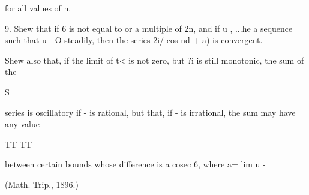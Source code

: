 for all values of n.

9. Shew that if 6 is not equal to or a multiple of 2n, and if %
u , ...he a sequence such that u - O steadily, then the series 2i/ cos
nd + a) is convergent.

Shew also that, if the limit of t< is not zero, but ?i is still
monotonic, the sum of the

S

series is oscillatory if - is rational, but that, if - is irrational,
the sum may have any value

TT TT

between certain bounds whose difference is a cosec 6, where a= lim u -

(Math. Trip., 1896.)

